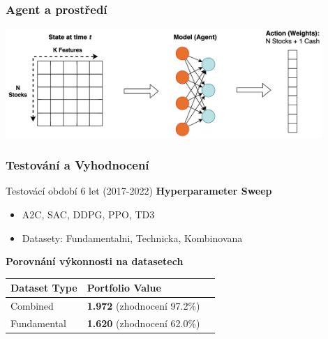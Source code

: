 \begin{frame}
    \frametitle{Agent a prostředí}

    \begin{center}
        \centering
        \includegraphics[width=0.9\textwidth]{img/env}
    \end{center}
\end{frame}

\begin{frame}
    \frametitle{Testování a Vyhodnocení}
    Testovácí období 6 let (2017-2022)
    \newline
    \newline
    \textbf{Hyperparameter Sweep}
    \begin{itemize}
        \item A2C, SAC, DDPG, PPO, TD3
        \item Datasety: Fundamentalni, Technicka, Kombinovana
    \end{itemize}
    \textbf{Porovnání výkonnosti na datasetech}
    \begin{table}
        \centering
        {\footnotesize
            \begin{tabular}{|l|l|l|}
                \hline
                \textbf{Dataset Type} & \textbf{Portfolio Value}                                       \\ \hline
                Combined              & \textcolor[RGB]{50,150,50}{\textbf{1.972} (zhodnocení 97.2\%)} \\ \hline
                Fundamental           & \textcolor[RGB]{150,50,50}{\textbf{1.620} (zhodnocení 62.0\%)} \\ \hline
            \end{tabular}

}
\end{table}
\end{frame}
